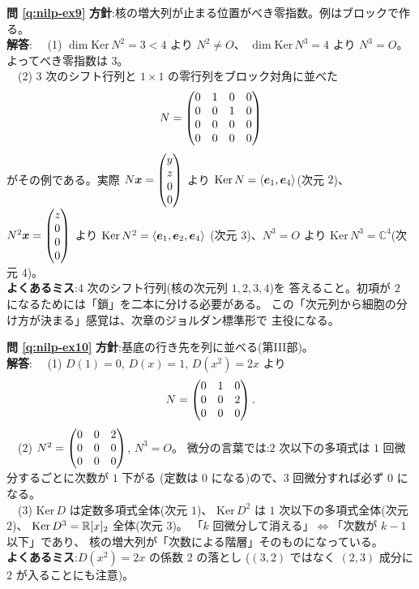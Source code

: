 \bigskip
\noindent\textbf{問 \ref{q:nilp-ex9}}\quad
\textbf{方針}:核の増大列が止まる位置がべき零指数。例はブロックで作る。\\
\textbf{解答}:
　(1) $\dim \mathrm{Ker}\,N^2 = 3 < 4$ より $N^2 \neq O$、
$\dim \mathrm{Ker}\,N^3 = 4$ より $N^3 = O$。よってべき零指数は $3$。\\
　(2) $3$ 次のシフト行列と $1 \times 1$ の零行列をブロック対角に並べた
\[
N = \begin{pmatrix}0 & 1 & 0 & 0 \\ 0 & 0 & 1 & 0 \\ 0 & 0 & 0 & 0 \\ 0 & 0 & 0 & 0\end{pmatrix}
\]
がその例である。実際 $N\bm{x} = \begin{pmatrix}y \\ z \\ 0 \\ 0\end{pmatrix}$ より
$\mathrm{Ker}\,N = \langle \bm{e}_1, \bm{e}_4 \rangle$(次元 $2$)、
$N^2\bm{x} = \begin{pmatrix}z \\ 0 \\ 0 \\ 0\end{pmatrix}$ より
$\mathrm{Ker}\,N^2 = \langle \bm{e}_1, \bm{e}_2, \bm{e}_4 \rangle$
(次元 $3$)、$N^3 = O$ より $\mathrm{Ker}\,N^3 = \mathbb{C}^4$(次元 $4$)。\\
\textbf{よくあるミス}:$4$ 次のシフト行列(核の次元列 $1, 2, 3, 4$)を
答えること。初項が $2$ になるためには「鎖」を二本に分ける必要がある。
この「次元列から細胞の分け方が決まる」感覚は、次章のジョルダン標準形で
主役になる。

\bigskip
\noindent\textbf{問 \ref{q:nilp-ex10}}\quad
\textbf{方針}:基底の行き先を列に並べる(第III部)。\\
\textbf{解答}:
　(1) $D(1) = 0$, $D(x) = 1$, $D(x^2) = 2x$ より
\[
N = \begin{pmatrix}0 & 1 & 0 \\ 0 & 0 & 2 \\ 0 & 0 & 0\end{pmatrix}.
\]
　(2) $N^2 = \begin{pmatrix}0 & 0 & 2 \\ 0 & 0 & 0 \\ 0 & 0 & 0\end{pmatrix}$, $N^3 = O$。
微分の言葉では:$2$ 次以下の多項式は $1$ 回微分するごとに次数が $1$ 下がる
(定数は $0$ になる)ので、$3$ 回微分すれば必ず $0$ になる。\\
　(3) $\mathrm{Ker}\,D$ は定数多項式全体(次元 $1$)、
$\mathrm{Ker}\,D^2$ は $1$ 次以下の多項式全体(次元 $2$)、
$\mathrm{Ker}\,D^3 = \mathbb{R}[x]_2$ 全体(次元 $3$)。
「$k$ 回微分して消える」$\iff$「次数が $k - 1$ 以下」であり、
核の増大列が「次数による階層」そのものになっている。\\
\textbf{よくあるミス}:$D(x^2) = 2x$ の係数 $2$ の落とし
($(3, 2)$ ではなく $(2, 3)$ 成分に $2$ が入ることにも注意)。

